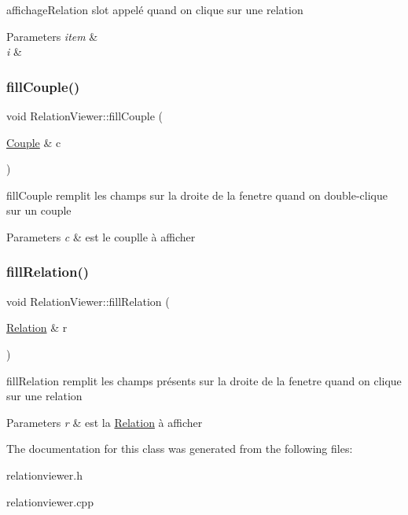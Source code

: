 affichage\+Relation slot appelé quand on clique sur une relation 


\begin{DoxyParams}{Parameters}
{\em item} & \\
\hline
{\em i} & \\
\hline
\end{DoxyParams}
\mbox{\label{classRelationViewer_aa3923d489adae30c57fd94b64ced8924}} 
\subsubsection{\texorpdfstring{fill\+Couple()}{fillCouple()}}
{\footnotesize\ttfamily void Relation\+Viewer\+::fill\+Couple (\begin{DoxyParamCaption}\item[{\hyperlink{classCouple}{Couple} \&}]{c }\end{DoxyParamCaption})}



fill\+Couple remplit les champs sur la droite de la fenetre quand on double-\/clique sur un couple 


\begin{DoxyParams}{Parameters}
{\em c} & est le couplle à afficher \\
\hline
\end{DoxyParams}
\mbox{\label{classRelationViewer_a236974b7e44ea4c67da7794812623194}} 
\subsubsection{\texorpdfstring{fill\+Relation()}{fillRelation()}}
{\footnotesize\ttfamily void Relation\+Viewer\+::fill\+Relation (\begin{DoxyParamCaption}\item[{\hyperlink{classRelation}{Relation} \&}]{r }\end{DoxyParamCaption})}



fill\+Relation remplit les champs présents sur la droite de la fenetre quand on clique sur une relation 


\begin{DoxyParams}{Parameters}
{\em r} & est la \hyperlink{classRelation}{Relation} à afficher \\
\hline
\end{DoxyParams}


The documentation for this class was generated from the following files\+:\begin{DoxyCompactItemize}
\item 
relationviewer.\+h\item 
relationviewer.\+cpp\end{DoxyCompactItemize}
